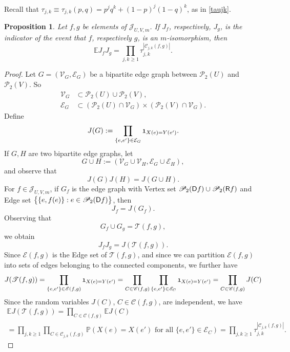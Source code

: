 \documentclass[reqno]{amsart}
\theoremstyle{theorem}
\newtheorem{proposition}[theorem]{Proposition}
\theoremstyle{definition}
\theoremstyle{remark}
\def\P{\mathbb{P}}
\def\E{\mathbb{E}}
\def\PP{\mathscr{P}}
\def\TT{\mathscr{T}}
\def\CC{\mathscr{C}}
\def\EE{\mathscr{E}}
\def\VV{\mathscr{V}}
\newcommand{\1}{{\text{\Large $\mathfrak 1$}}}	%
\numberwithin{equation}{section}
\def\JJ{\mathscr J}
\newcommand{\I}{{\text{\Large $\mathfrak 1$}}}	%
\def\ran{{\sf R}}
\def\dom{{\sf D}}
\begin{document}
Recall that
$\tau_{j,k} \equiv \tau_{j,k}(p,q) = p^jq^k + (1-p)^j (1-q)^k$, as
in \eqref{taujk}. 
\begin{proposition}
\label{propN2tris}
Let $f, g$ be elements of $\JJ_{U,V,m}$.
If $J_f$, respectively, $J_g$,
is the indicator of the event that $f$, respectively $g$, is an $m$-isomorphism,
then
\begin{equation}
\label{N2tris} 
\E J_f J_g = \prod_{j,k \ge 1} \tau_{j,k}^{|\CC_{j,k}(f,g)|}.
\end{equation}
\end{proposition}
\begin{proof}
Let $G=(\VV_G, \EE_G)$ be a bipartite edge graph 
between $\PP_2(U)$ and $\PP_2(V)$. So
\begin{align*}
\VV_G &\subset \PP_2(U) \cup \PP_2(V),\\
\EE_G &\subset (\PP_2(U) \cap \VV_G) \times (\PP_2(V) \cap \VV_G).
\end{align*}
Define
\[
J(G) := \prod_{\{e, e'\} \in \mathcal{E}_G} \I_{X(e) = Y(e')}.
\]
If $G, H$ are two bipartite edge graphs, let 
\[
G \cup H := (\VV_G \cup \VV_H, \EE_G \cup \EE_H),
\]
and observe that
\[
J(G)J(H) = J(G \cup H).
\]
For $f \in \JJ_{U,V,m}$, if $G_f$ is the edge graph with Vertex set 
$\PP_2(\dom f) \cup \PP_2(\ran f)$
and Edge set $\big\{\{e, f(e)\}: e \in \PP_2(\dom f)\big\}$, then
\[
J_f = J(G_f). 
\]
Observing that
\[
G_f \cup G_g = \TT(f,g),
\]
we obtain
\[
J_f J_g = J(\TT(f,g)).
\]
Since $\EE(f,g)$ is the Edge set of $\TT(f,g)$,
and since we can partition $\EE(f,g)$ into sets of edges belonging to
the connected components,
we further have
\[
J(\TT(f,g)) = \prod_{\{e,e'\} \in \EE(f,g)} \1_{X(e)=Y(e')}
= \prod_{C \in \CC(f,g)} \prod_{\{e,e'\} \in \EE_C} \1_{X(e)=Y(e')}
= \prod_{C \in \CC(f,g)} J(C) 
\]
Since the random variables $J(C)$, $C \in \CC(f,g)$, are independent,
we have
\begin{multline*}
\E J(\TT(f,g)) = \prod_{C \in \CC(f,g)} \E J(C)
\\
= \prod_{j,k \ge 1} \prod_{C \in \CC_{j,k}(f,g)} \P(X(e)=X(e') \text{ for all }
\{e,e'\} \in \EE_C)
= \prod_{j,k \ge 1} \tau_{j,k}^{|\CC_{j,k}(f,g)|}.
\end{multline*}
\end{proof}
\end{document}
